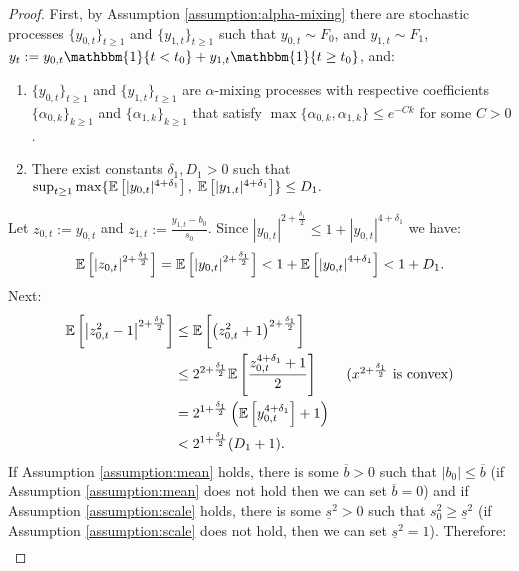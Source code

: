 \begin{proof}

First, by Assumption \ref{assumption:alpha-mixing} there are stochastic processes $\{y_{0,t}\}_{t \geq 1}$ and $\{y_{1,t}\}_{t \geq 1}$ such that $y_{0,t} \sim F_0$, and $y_{1,t} \sim F_1$, $y_t := y_{0,t} \mathbbm{1}\{t < t_0\}  + y_{1,t}\mathbbm{1}\{t \geq t_0\}$, and:
    \begin{enumerate}[label=(\roman*)]
        \item $\{y_{0,t}\}_{t \geq 1}$ and $\{y_{1,t}\}_{t \geq 1}$ are $\alpha$-mixing processes with respective coefficients $\{\alpha_{0,k}\}_{k\geq 1}$ and $\{\alpha_{1,k}\}_{k\geq 1}$ that satisfy $\max\{\alpha_{0,k}, \alpha_{1,k}\} \leq e^{-C k}$ for some $C > 0$.
        \item There exist constants $\delta_1, D_1 > 0$ such that $\sup_{t \geq 1} \max\{\mathbb{E}\left[|y_{0,t}|^{4+\delta_1}\right],\;\mathbb{E}\left[|y_{1,t}|^{4+\delta_1}\right]\}\leq D_1.$  
    \end{enumerate}
Let $z_{0,t} := y_{0,t}$ and $z_{1,t} := \frac{y_{1,t} - b_0}{s_0}$. Since $|y_{0,t}|^{2+\frac{\delta_1}{2}} \leq 1 + |y_{0,t}|^{4+\delta_1}$ we have:
\begin{align*}
    \mathbb{E}\left[\left|z_{0,t}\right|^{2 + \frac{\delta_1}{2}}\right] = \mathbb{E}\left[\left|y_{0,t}\right|^{2 + \frac{\delta_1}{2}}\right] < 1 + \mathbb{E}\left[\left|y_{0,t}\right|^{4 + \delta_1}\right] < 1 + D_1.
\end{align*}
Next:
\begin{align*}
    \E\left[\left|z^2_{0,t} -1 \right|^{2+\frac{\delta_1}{2}}\right] &\leq \E\left[\left(z_{0,t}^2 + 1\right)^{2+\frac{\delta_1}{2}}\right]\\
    &\leq 2^{2+\frac{\delta_1}{2}}\E\left[\frac{z_{0,t}^{4+\delta_1} + 1}{2}\right] \tag{$x^{2+\frac{\delta_1}{2}}$ is convex}\\
    &=2^{1+\frac{\delta_1}{2}}\left(\E\left[y_{0,t}^{4+\delta_1} \right]+ 1\right) \\
    &< 2^{1+\frac{\delta_1}{2}}(D_1 + 1).    
\end{align*}
If Assumption \ref{assumption:mean} holds, there is some $\overline{b} > 0$ such that $|b_0| \leq \overline{b}$ (if Assumption \ref{assumption:mean} does not hold then we can set $\overline{b}=0$) and if Assumption \ref{assumption:scale} holds, there is some $\underline{s}^2 > 0$ such that $s^2_0 \geq \underline{s}^2$ (if Assumption \ref{assumption:scale} does not hold, then we can set $\underline{s}^2=1$). Therefore:
\begin{align*}

\end{align*}
\end{proof}
